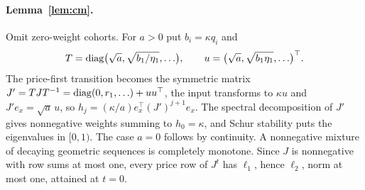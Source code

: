 \documentclass[12pt]{article}
\theoremstyle{definition}
\theoremstyle{remark}
\begin{document}
\paragraph{Lemma~\ref{lem:cm}.} Omit zero-weight cohorts. For $a>0$ put $b_i=\kappa q_i$ and
\[
T={\rm diag}\bigl(\sqrt a,\sqrt{b_1/\eta_1},\ldots\bigr),\qquad u=\bigl(\sqrt a,\sqrt{b_1\eta_1},\ldots\bigr)^\top .
\]
The price-first transition becomes the symmetric matrix $J'=TJT^{-1}={\rm diag}(0,r_1,\ldots)+uu^\top$, the input transforms to $\kappa u$ and $J'e_x=\sqrt a\,u$, so $h_j=(\kappa/a)e_x^\top(J')^{j+1}e_x$. The spectral decomposition of $J'$ gives nonnegative weights summing to $h_0=\kappa$, and Schur stability puts the eigenvalues in $[0,1)$. The case $a=0$ follows by continuity. A nonnegative mixture of decaying geometric sequences is completely monotone. Since $J$ is nonnegative with row sums at most one, every price row of $J^t$ has $\ell_1$, hence $\ell_2$, norm at most one, attained at $t=0$.
\end{document}
